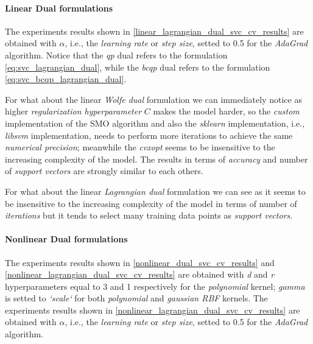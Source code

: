 \pagebreak

\paragraph{Linear Dual formulations}

The experiments results shown in \ref{linear_lagrangian_dual_svc_cv_results} are obtained with $\alpha$, i.e., the \emph{learning rate} or \emph{step size}, setted to 0.5 for the \emph{AdaGrad} algorithm. Notice that the \emph{qp} dual refers to the formulation \eqref{eq:svc_lagrangian_dual}, while the \emph{bcqp} dual refers to the formulation \eqref{eq:svc_bcqp_lagrangian_dual}.



For what about the linear \emph{Wolfe dual} formulation we can immediately notice as higher \emph{regularization hyperparameter} $C$ makes the model harder, so the \emph{custom} implementation of the SMO algorithm and also the \emph{sklearn} implementation, i.e., \emph{libsvm} \cite{chang2011libsvm} implementation, needs to perform more iterations to achieve the same \emph{numerical precision}; meanwhile the \emph{cvxopt} \cite{vandenberghe2010cvxopt} seems to be insensitive to the increasing complexity of the model. The results in terms of \emph{accuracy} and number of \emph{support vectors} are strongly similar to each others.



For what about the linear \emph{Lagrangian dual} formulation we can see as it seems to be insensitive to the increasing complexity of the model in terms of number of \emph{iterations} but it tends to select many training data points as \emph{support vectors}.

\pagebreak

\paragraph{Nonlinear Dual formulations}

The experiments results shown in \ref{nonlinear_dual_svc_cv_results} and \ref{nonlinear_lagrangian_dual_svc_cv_results} are obtained with \emph{d} and \emph{r} hyperparameters equal to 3 and 1 respectively for the \emph{polynomial} kernel; \emph{gamma} is setted to \emph{`scale`} for both \emph{polynomial} and \emph{gaussian RBF} kernels. The experiments results shown in \ref{nonlinear_lagrangian_dual_svc_cv_results} are obtained with $\alpha$, i.e., the \emph{learning rate} or \emph{step size}, setted to 0.5 for the \emph{AdaGrad} algorithm.

